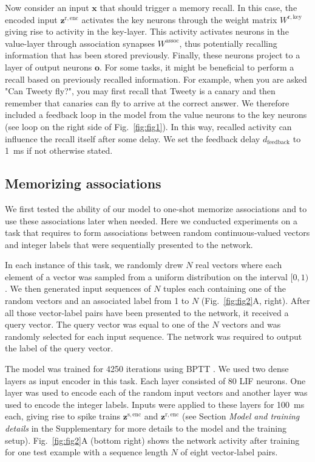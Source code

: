 \documentclass{article}
\newcommand{\vm}[1]{\bm{#1}}
\begin{document}
Now consider an input $\vm{x}$ that should trigger a memory recall. In this case, the encoded input $\vm{z}^{\mathrm{r,enc}}$ activates the key neurons through the weight matrix $W^{\mathrm{r,key}}$ giving rise to activity in the key-layer. This activity activates neurons in the value-layer through association synapses $W^{\mathrm{assoc}}$, thus potentially recalling information that has been stored previously. Finally, these neurons project to a layer of output neurons $\vm{o}$. For some tasks, it might be beneficial to perform a recall based on previously recalled information. For example, when you are asked "Can Tweety fly?", you may first recall that Tweety is a canary and then remember that canaries can fly to arrive at the correct answer. We therefore included a feedback loop in the model from the value neurons to the key neurons (see loop on the right side of Fig.~\ref{fig:fig1}). In this way, recalled activity can influence the recall itself after some delay. We set the feedback delay $d_\mathrm{feedback}$ to \SI{1}{ms} if not otherwise stated.

\subsection{Memorizing associations}
\label{sec:results-random_associations}
We first tested the ability of our model to one-shot memorize associations and to use these associations later when needed. Here we conducted experiments on a task that requires to form associations between random continuous-valued vectors and integer labels that were sequentially presented to the network.

In each instance of this task, we randomly drew $N$ real vectors where each element of a vector was sampled from a uniform distribution on the interval $[0, 1)$. We then generated input sequences of $N$ tuples each containing one of the random vectors and an associated label from \num{1} to $N$ (Fig.~\ref{fig:fig2}A, right). After all those vector-label pairs have been presented to the network, it received a query vector. The query vector was equal to one of the $N$ vectors and was randomly selected for each input sequence. The network was required to output the label of the query vector.

The model was trained for \num{4250} iterations using \gls{BPTT} \cite{werbos1990backpropagation,bellec2018long}. We used two dense layers as input encoder in this task. Each layer consisted of \num{80} \gls{LIF} neurons. One layer was used to encode each of the random input vectors and another layer was used to encode the integer labels. Inputs were applied to these layers for \SI{100}{\ms} each, giving rise to spike trains $\vm{z}^\mathrm{s,enc}$ and $\vm{z}^\mathrm{r,enc}$ (see Section \emph{Model and training details} in the Supplementary for more details to the model and the training setup). Fig.~\ref{fig:fig2}A (bottom right) shows the network activity after training for one test example with a sequence length $N$ of eight vector-label pairs.
\end{document}
